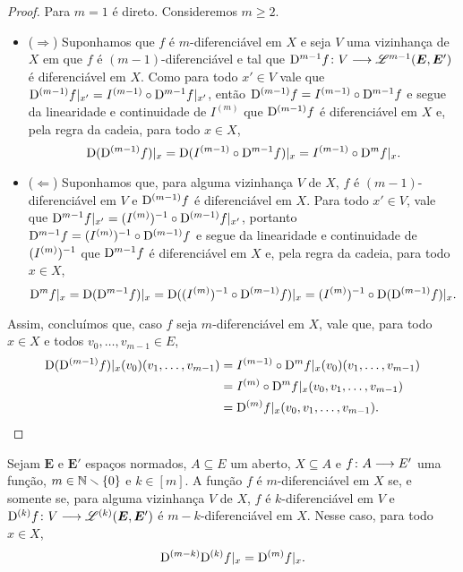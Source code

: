 \begin{proof}
Para $m=1$ é direto. Consideremos $m \geq 2$.
	\begin{itemize}
	\item ($\Rightarrow$) Suponhamos que $f$ é $m$-diferenciável em $X$ e seja $V$ uma vizinhança de $X$ em que $f$ é $(m-1)$-diferenciável e tal que ${\mathrm{D}^{m-1} f}\colon {V} \longrightarrow {\mathscr{L}^{m-1}(\bm E, \bm E')}$ é diferenciável em $X$. Como para todo $x' \in V$ vale que $\mathrm{D}^{(m-1)} f|_{x'} = I^{(m-1)} \circ \mathrm{D}^{m-1} f|_{x'}$, então $\mathrm{D}^{(m-1)} f = I^{(m-1)} \circ \mathrm{D}^{m-1} f$ e segue da linearidade e continuidade de $I^{(m)}$ que $\mathrm{D}^{(m-1)} f$ é diferenciável em $X$ e, pela regra da cadeia, para todo $x \in X$,
		\begin{equation*}
		\mathrm{D} (\mathrm{D}^{(m-1)} f)|_x = \mathrm{D} (I^{(m-1)} \circ \mathrm{D}^{m-1} f)|_x = I^{(m-1)} \circ \mathrm{D}^m f|_x.
		\end{equation*}

	\item ($\Leftarrow$) Suponhamos que, para alguma vizinhança $V$ de $X$, $f$ é $(m-1)$-diferenciável em $V$ e $\mathrm{D}^{(m-1)} f$ é diferenciável em $X$. Para todo $x' \in V$, vale que $\mathrm{D}^{m-1} f|_{x'} = (I^{(m)})^{-1} \circ \mathrm{D}^{(m-1)} f|_{x'}$, portanto $\mathrm{D}^{m-1} f = (I^{(m)})^{-1} \circ \mathrm{D}^{(m-1)} f$ e segue da linearidade e continuidade de $(I^{(m)})^{-1}$ que $\mathrm{D}^{m-1} f$ é diferenciável em $X$ e, pela regra da cadeia, para todo $x \in X$,
		\begin{equation*}
		\mathrm{D}^m f|_x = \mathrm{D} (\mathrm{D}^{m-1} f)|_x = \mathrm{D} ((I^{(m)})^{-1} \circ \mathrm{D}^{(m-1)} f)|_x = (I^{(m)})^{-1} \circ \mathrm{D}(\mathrm{D}^{(m-1)} f)|_x.
		\end{equation*}
	\end{itemize}

Assim, concluímos que, caso $f$ seja $m$-diferenciável em $X$, vale que, para todo $x \in X$ e todos $v_0, \ldots, v_{m-1} \in E$,
	\begin{align*}
	\mathrm{D} (\mathrm{D}^{(m-1)} f)|_x(v_0) (v_1, \ldots, v_{m-1}) &= I^{(m-1)} \circ \mathrm{D}^m f|_x (v_0) (v_1, \ldots, v_{m-1}) \\
		&= I^{(m)} \circ \mathrm{D}^m f|_x (v_0, v_1, \ldots, v_{m-1}) \\
		&= \mathrm{D}^{(m)} f|_x (v_0, v_1, \ldots, v_{m-1}).
		\qedhere
	\end{align*}
\end{proof}

\begin{exercise}
Sejam $\bm E$ e $\bm E'$ espaços normados, $A \subseteq E$ um aberto, $X \subseteq A$ e ${f}\colon {A} \longrightarrow {E'}$ uma função, $m \in \mathbb{N} \smallsetminus \{0\}$ e $k \in [m]$. A função $f$ é $m$-diferenciável em $X$ se, e somente se, para alguma vizinhança $V$ de $X$, $f$ é $k$-diferenciável em $V$ e ${\mathrm{D}^{(k)} f}\colon {V} \longrightarrow {\mathscr{L}^{(k)}(\bm E, \bm E')}$ é $m-k$-diferenciável em $X$. Nesse caso, para todo $x \in X$,
	\begin{equation*}
	\mathrm{D}^{(m-k)}\mathrm{D}^{(k)} f|_x = \mathrm{D}^{(m)} f|_x.
	\end{equation*}

\end{exercise}


